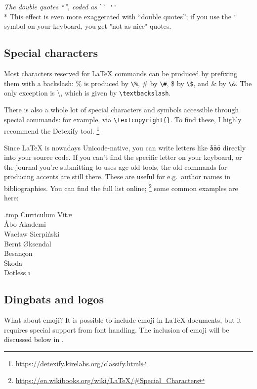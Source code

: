\medskip\noindent\emph{The double quotes ``'', coded as} \verb|`` ''|\\*
This effect is even more exaggerated with ``double quotes'';
if you use the \verb|"| symbol on your keyboard,
you get "not as nice" quotes.



%
%
\subsection{Special characters}

Most characters reserved for \LaTeX{} commands can be produced by prefixing them with a backslash:
\% is produced by \verb|\%|, \# by \verb|\#|, \$ by \verb|\$|, and \& by \verb|\&|.
The only exception is \textbackslash, which is given by \verb|\textbackslash|.

There is also a whole lot of special characters and symbols accessible
through special commands: for example, \textcopyright{} via \verb|\textcopyright{}|.
To find these, I highly recommend the Detexify tool.%
\footnote{\url{https://detexify.kirelabs.org/classify.html}}

\bigskip\noindent%
Since \LaTeX{} is nowadays Unicode-native,
you can write letters like \verb|åäö| directly into your source code.
If you can't find the specific letter on your keyboard,
or the journal you're submitting to uses age-old tools,
the old commands for producing accents are still there.
These are useful for e.g.\ author names in bibliographies.
You can find the full list online;%
\footnote{\url{https://en.wikibooks.org/wiki/LaTeX/\#Special_Characters}}
some common examples are here:
%
\begin{VerbatimOut}{\jobname.tmp}
Curriculum Vit\ae\\
\r{A}bo Akademi\\
Wac\l{}aw Sierpi\'{n}ski\\
Bernt \O{}ksendal\\
Besan\c{c}on\\
\v{S}koda\\
Dotless \i
\end{VerbatimOut}
\ShowExample


%
%
\subsection{Dingbats and logos}


What about emoji?
It is possible to include emoji in \LaTeX{} documents,
but it requires special support from font handling.
The inclusion of emoji will be discussed below in .


